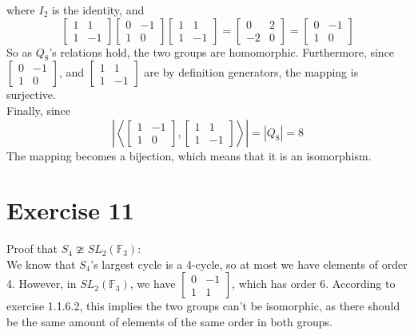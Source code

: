 \documentclass[12pt]{article}
\newcommand{\F}{\mathbb{F}}
\begin{document}
    where $I_2$ is the identity, and
    \[ \begin{bmatrix} 1 & 1 \\ 1 & -1 \end{bmatrix}
    \begin{bmatrix} 0 & -1 \\ 1 & 0 \end{bmatrix}
    \begin{bmatrix} 1 & 1 \\ 1 & -1 \end{bmatrix}
    = \begin{bmatrix} 0 & 2 \\ -2 & 0 \end{bmatrix}
    = \begin{bmatrix} 0 & -1 \\ 1 & 0 \end{bmatrix} \]
    So as $Q_8$'s relations hold,
    the two groups are homomorphic.
    Furthermore,
    since $\begin{bmatrix} 0 & -1 \\ 1 & 0 \end{bmatrix}$,
    and $\begin{bmatrix} 1 & 1 \\ 1 & -1 \end{bmatrix}$
    are by definition generators,
    the mapping is surjective. \\
    Finally, since
    \[ \left| \left\langle \begin{bmatrix} 1 & -1 \\ 1 & 0 \end{bmatrix},
    \begin{bmatrix} 1 & 1 \\ 1 & -1 \end{bmatrix} \right\rangle \right|
    = |Q_8| = 8 \]
    The mapping becomes a bijection,
    which means that it is an isomorphism.


    \section*{Exercise 11}
    Proof that $S_4 \ncong SL_2(\F_3)$: \\
    We know that $S_4$'s largest cycle is a 4-cycle,
    so at most we have elements of order 4.
    However, in $SL_2(\F_3)$,
    we have $ \begin{bmatrix} 0 & -1 \\ 1 & 1 \end{bmatrix}$,
    which has order 6.
    According to exercise 1.1.6.2,
    this implies the two groups can't be isomorphic,
    as there should be the same amount of elements of the same
    order in both groups.
\end{document}
